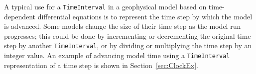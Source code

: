 
A typical use for a {\tt TimeInterval} in a geophysical model 
based on time-dependent differential equations is to represent 
the time step by which the model is advanced.  Some models change 
the size of their time step as the model run progresses; this could
be done by incrementing or decrementing the original time 
step by another {\tt TimeInterval}, or by dividing or multiplying
the time step by an integer value.  An example of advancing 
model time using a {\tt TimeInterval} representation of a time
step is shown in Section~\ref{sec:ClockEx}.



